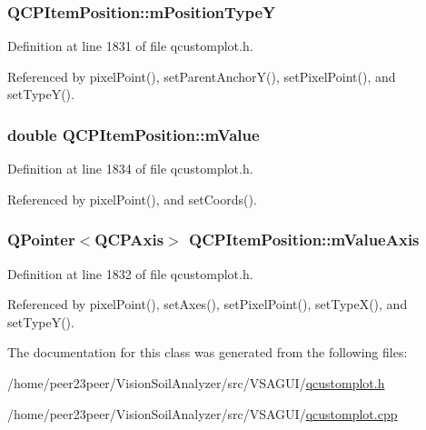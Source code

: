 \subsubsection[{m\+Position\+Type\+Y}]{ Q\+C\+P\+Item\+Position\+::m\+Position\+Type\+Y\hspace{0.3cm}{\ttfamily [protected]}}\label{class_q_c_p_item_position_a47c96c0ef4380e1af4aaa7c2265c260b}


Definition at line 1831 of file qcustomplot.\+h.



Referenced by pixel\+Point(), set\+Parent\+Anchor\+Y(), set\+Pixel\+Point(), and set\+Type\+Y().

\hypertarget{class_q_c_p_item_position_a67bf5df69f587d53731724a7d61c6c3f}{}
\subsubsection[{m\+Value}]{\setlength{\rightskip}{0pt plus 5cm}double Q\+C\+P\+Item\+Position\+::m\+Value\hspace{0.3cm}{\ttfamily [protected]}}\label{class_q_c_p_item_position_a67bf5df69f587d53731724a7d61c6c3f}


Definition at line 1834 of file qcustomplot.\+h.



Referenced by pixel\+Point(), and set\+Coords().

\hypertarget{class_q_c_p_item_position_a505dc2da24ba274452c1c817fcaba011}{}
\subsubsection[{m\+Value\+Axis}]{\setlength{\rightskip}{0pt plus 5cm}Q\+Pointer$<${\bf Q\+C\+P\+Axis}$>$ Q\+C\+P\+Item\+Position\+::m\+Value\+Axis\hspace{0.3cm}{\ttfamily [protected]}}\label{class_q_c_p_item_position_a505dc2da24ba274452c1c817fcaba011}


Definition at line 1832 of file qcustomplot.\+h.



Referenced by pixel\+Point(), set\+Axes(), set\+Pixel\+Point(), set\+Type\+X(), and set\+Type\+Y().



The documentation for this class was generated from the following files\+:\begin{DoxyCompactItemize}
\item 
/home/peer23peer/\+Vision\+Soil\+Analyzer/src/\+V\+S\+A\+G\+U\+I/\hyperlink{qcustomplot_8h}{qcustomplot.\+h}\item 
/home/peer23peer/\+Vision\+Soil\+Analyzer/src/\+V\+S\+A\+G\+U\+I/\hyperlink{qcustomplot_8cpp}{qcustomplot.\+cpp}\end{DoxyCompactItemize}
